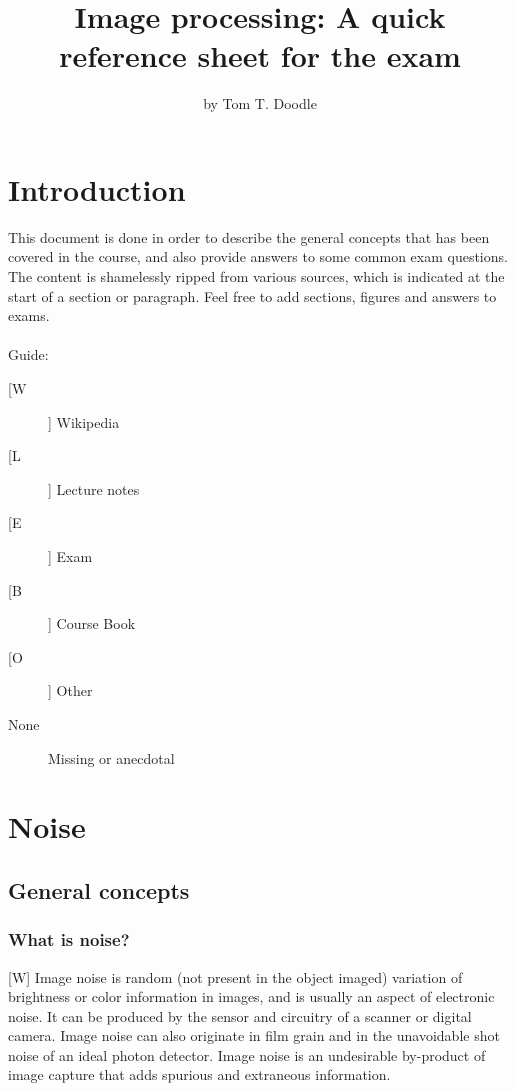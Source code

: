 \documentclass[12pt]{article}
\title{Image processing: A quick reference sheet for the exam}
\author{by Tom T. Doodle}
\begin{document}
\maketitle
\newpage
\tableofcontents
\newpage

\section{Introduction}
	This document is done in order to describe the general concepts
	that has been covered in the course, and also provide answers to
	some common exam questions. The content is shamelessly ripped from
	various sources, which is indicated at the start of a section
	or paragraph. Feel free to add sections, figures and answers to
	exams.\\
	\\	
	Guide:
	\begin{description}
		\item[[W]] Wikipedia
		\item[[L]] Lecture notes
		\item[[E]] Exam
		\item[[B]] Course Book
		\item[[O]] Other
		\item[None] Missing or anecdotal
	\end{description}
	
%	
%
\section{Noise}
	\subsection{General concepts}
	\subsubsection{What is noise?}
	
	[W] Image noise is random (not present in the object imaged) variation of brightness or
	color information in images, and is usually an aspect of electronic noise. It can be
	produced by the sensor and circuitry of a scanner or digital camera. Image noise can
	also originate in film grain and in the unavoidable shot noise of an ideal photon 
	detector. Image noise is an undesirable by-product of image capture that adds spurious 
	and extraneous information.\\
	
\end{document}
